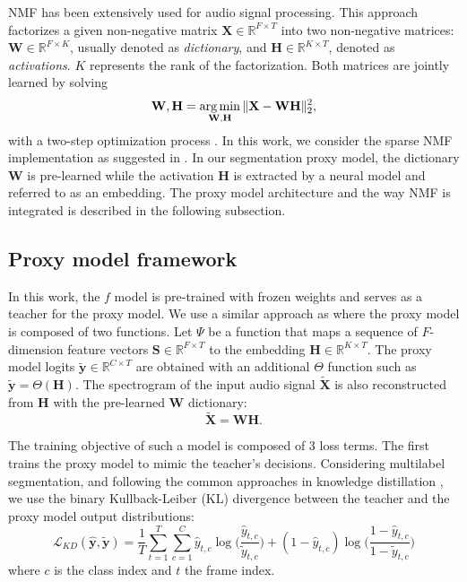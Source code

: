 NMF has been extensively used for audio signal processing.
This approach factorizes a given non-negative matrix $\mathbf{X}\in\mathbb{R}^{F\times T}$ into two non-negative matrices: $\mathbf{W}\in\mathbb{R}^{F\times K}$, usually denoted as \textit{dictionary}, and $\mathbf{H}\in\mathbb{R}^{K\times T}$, denoted as \textit{activations}.
$K$ represents the rank of the factorization.
Both matrices are jointly learned by solving
\begin{equation}
    \mathbf{W},\mathbf{H} = \operatorname*{arg\,min}_{\mathbf{W},\mathbf{H}} \|\mathbf{X}-\mathbf{W}\mathbf{H}\|_2^2,
\end{equation}
with a two-step optimization process \cite{lee2000algorithms}.
In this work, we consider the sparse NMF implementation \cite{le2015sparse} as suggested in \cite{parekh2023tackling}.
In our segmentation proxy model, the dictionary $\mathbf{W}$ is pre-learned while the activation $\mathbf{H}$ is extracted by a neural model and referred to as an embedding.
The proxy model architecture and the way NMF is integrated is described in the following subsection.

\subsection{Proxy model framework}

In this work, the $f$ model is pre-trained with frozen weights and serves as a teacher for the proxy model.
We use a similar approach as \cite{parekh2023tackling} where the proxy model is composed of two functions.
Let $\Psi$ be a function that maps a sequence of $F$-dimension feature vectors $\mathbf{S}\in \mathbb{R}^{F\times T}$ to the embedding $\mathbf{H}\in \mathbb{R}^{K \times T}$. 
The proxy model logits $\tilde{\mathbf{y}}\in\mathbb{R}^{C\times T}$ are obtained with an additional $\Theta$ function such as $\tilde{\mathbf{y}}=\Theta(\mathbf{H})$.
The spectrogram of the input audio signal $\tilde{\mathbf{X}}$ is also reconstructed from $\mathbf{H}$ with the pre-learned $\mathbf{W}$ dictionary:
\begin{equation}
    \tilde{\mathbf{X}} = \mathbf{W}\mathbf{H}.
\end{equation}

The training objective of such a model is composed of 3 loss terms.
The first trains the proxy model to mimic the teacher's decisions.
Considering multilabel segmentation, and following the common approaches in knowledge distillation \cite{}, we use the binary Kullback-Leiber (KL) divergence between the teacher and the proxy model output distributions:
\begin{equation}
\mathcal{L}_{KD}(\hat{\mathbf{y}},\tilde{\mathbf{y}})=\frac{1}{T}\sum_{t=1}^T\sum_{c=1}^C\hat{{y}}_{t,c} \log\Big(\frac{\hat{{y}}_{t,c}}{\tilde{{y}}_{t,c}}\Big) + (1-\hat{{y}}_{t,c}) \log\Big(\frac{1-\hat{{y}}_{t,c}}{1-\tilde{{y}}_{t,c}}\Big)
\end{equation}
where $c$ is the class index and $t$ the frame index.

